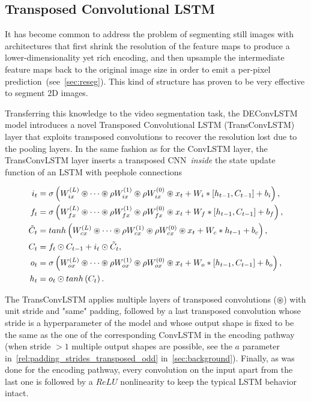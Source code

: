 \subsection{Transposed Convolutional LSTM}

It has become common to address the problem of segmenting still images with
architectures that first shrink the resolution of the feature maps to produce a
lower-dimensionality yet rich encoding, and then upsample the intermediate
feature maps back to the original image size in order to emit a per-pixel
prediction~(see~\autoref{sec:reseg}). This kind of structure has proven to be
very effective to segment 2D images.

Transferring this knowledge to the video segmentation task, the DEConvLSTM
model introduces a novel Transposed Convolutional LSTM (TransConvLSTM) layer
that exploits transposed convolutions to recover the resolution lost due to the
pooling layers. In the same fashion as for the ConvLSTM layer, the
TransConvLSTM layer inserts a transposed CNN~\emph{inside} the state update
function of an LSTM with peephole connections

\begin{equation}\label{eq:deconvLSTM_dec}
\begin{split}
    i_t &= \sigma\left(W_{ix}^{(L)} \circledast \dots \circledast
        \rho W_{ix}^{(1)} \circledast \rho W_{ix}^{(0)} \circledast x_t +
        W_i * \left[h_{t-1}, C_{t-1}\right] + b_i \right),\\
    f_t &= \sigma\left(W_{fx}^{(L)} \circledast \dots \circledast
        \rho W_{fx}^{(1)} \circledast \rho W_{fx}^{(0)} \circledast x_t +
        W_f * \left[h_{t-1}, C_{t-1}\right] + b_f \right),\\
    \tilde C_t &= tanh \left(W_{cx}^{(L)} \circledast \dots \circledast
        \rho W_{cx}^{(1)} \circledast \rho W_{cx}^{(0)} \circledast x_t +
        W_c * h_{t-1} + b_c \right),\\
    C_t &= f_t \odot C_{t-1} + i_t \odot \tilde C_t,\\
    o_t &= \sigma\left(W_{ox}^{(L)} \circledast \dots \circledast
        \rho W_{ox}^{(1)} \circledast \rho W_{ox}^{(0)} \circledast x_t +
        W_o * \left[h_{t-1}, C_{t-1}\right] + b_o \right),\\
    h_t &= o_t \odot tanh \left(C_t\right).
\end{split}
\end{equation}

\noindent The TransConvLSTM applies multiple layers of transposed convolutions
($\circledast$) with unit stride and "same" padding, followed by a last
transposed convolution whose stride is a hyperparameter of the model and whose
output shape is fixed to be the same as the one of the corresponding ConvLSTM
in the encoding pathway (when stride $> 1$ multiple output shapes are possible,
see the $a$ parameter in~\autoref{rel:padding_strides_transposed_odd}
in~\autoref{sec:background}). Finally, as was done for the encoding pathway,
every convolution on the input apart from the last one is followed by a $ReLU$
nonlinearity to keep the typical LSTM behavior intact.

